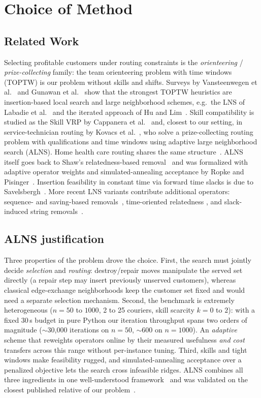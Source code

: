 \documentclass[10pt, a4paper]{article}
\begin{document}
\section{Choice of Method}
\subsection{Related Work}

Selecting profitable customers under routing constraints is the
\emph{orienteering} / \emph{prize-collecting} family: the team orienteering
problem with time windows (TOPTW) is our problem without skills and shifts.
Surveys by Vansteenwegen et al.~\cite{vansteenwegen2011} and Gunawan et
al.~\cite{gunawan2016} show that the strongest TOPTW heuristics are
insertion-based local search and large neighborhood schemes, e.g.\ the LNS of
Labadie et al.~\cite{labadie2012} and the iterated approach of Hu and
Lim~\cite{hulim2014}. Skill compatibility is studied as the Skill VRP by
Cappanera et al.~\cite{cappanera2011} and, closest to our setting, in
service-technician routing by Kovacs et al.~\cite{kovacs2012}, who solve a
prize-collecting routing problem with qualifications and time windows using
adaptive large neighborhood search (ALNS). Home health care routing shares
the same structure~\cite{cisse2017}. ALNS itself goes back to Shaw's
relatedness-based removal~\cite{shaw1998} and was formalized with adaptive
operator weights and simulated-annealing acceptance by Ropke and
Pisinger~\cite{ropke2006,pisinger2007}. Insertion feasibility in constant
time via forward time slacks is due to Savelsbergh~\cite{savelsbergh1992}.
More recent LNS variants contribute additional operators: sequence- and
saving-based removals~\cite{hammami2020}, time-oriented relatedness
\cite{demir2012}, and slack-induced string removals~\cite{christiaens2020}.

\subsection{ALNS justification}

Three properties of the problem drove the choice. First, the search must
jointly decide \emph{selection} and \emph{routing}: destroy/repair moves
manipulate the served set directly (a repair step may insert previously
unserved customers), whereas classical edge-exchange neighborhoods keep the
customer set fixed and would need a separate selection mechanism. Second,
the benchmark is extremely heterogeneous ($n=50$ to $1000$, 2 to 25
couriers, skill scarcity $k=0$ to $2$): with a fixed 30\,s budget in pure
Python our iteration throughput spans two orders of magnitude ($\sim$30{,}000
iterations on $n{=}50$, $\sim$600 on $n{=}1000$). An \emph{adaptive} scheme
that reweights operators online by their measured usefulness \emph{and cost}
transfers across this range without per-instance tuning. Third, skills and
tight windows make feasibility rugged, and simulated-annealing acceptance over a
penalized objective lets the search cross infeasible ridges. ALNS combines
all three ingredients in one well-understood framework~\cite{ropke2006} and
was validated on the closest published relative of our
problem~\cite{kovacs2012}.
\end{document}
